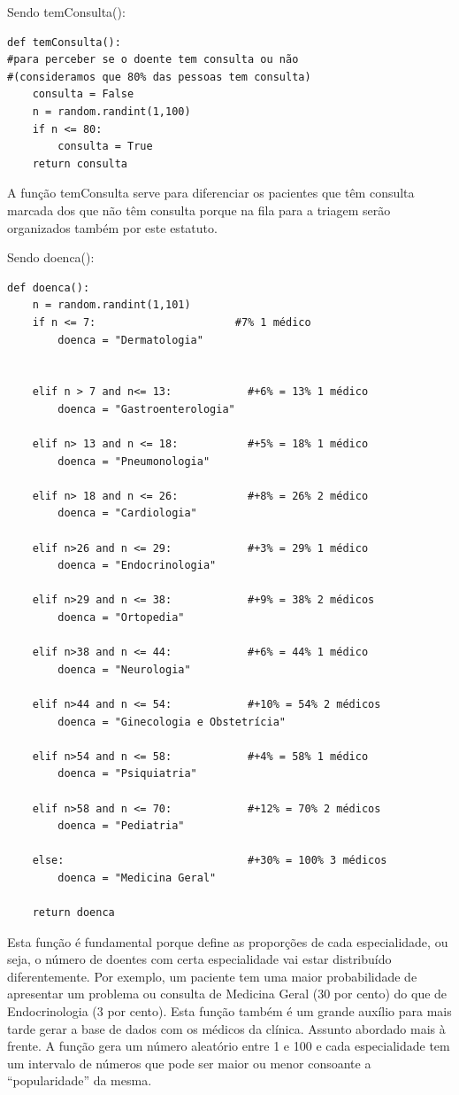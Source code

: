 \documentclass[12pt,a4paper]{article} %
\begin{document}
    Sendo temConsulta():
\hypertarget{temConsulta}{}
\begin{verbatim}
def temConsulta(): 
#para perceber se o doente tem consulta ou não 
#(consideramos que 80% das pessoas tem consulta)
    consulta = False
    n = random.randint(1,100) 
    if n <= 80:
        consulta = True
    return consulta
\end{verbatim}

    A função temConsulta serve para diferenciar os pacientes que têm consulta marcada dos que não têm consulta porque na fila para a triagem serão organizados também por este estatuto. 

    Sendo doenca(): 
\begin{verbatim}
def doenca():
    n = random.randint(1,101)
    if n <= 7:                      #7% 1 médico
        doenca = "Dermatologia"


    elif n > 7 and n<= 13:            #+6% = 13% 1 médico
        doenca = "Gastroenterologia"

    elif n> 13 and n <= 18:           #+5% = 18% 1 médico
        doenca = "Pneumonologia"

    elif n> 18 and n <= 26:           #+8% = 26% 2 médico
        doenca = "Cardiologia"

    elif n>26 and n <= 29:            #+3% = 29% 1 médico
        doenca = "Endocrinologia"

    elif n>29 and n <= 38:            #+9% = 38% 2 médicos
        doenca = "Ortopedia"

    elif n>38 and n <= 44:            #+6% = 44% 1 médico
        doenca = "Neurologia"

    elif n>44 and n <= 54:            #+10% = 54% 2 médicos
        doenca = "Ginecologia e Obstetrícia"

    elif n>54 and n <= 58:            #+4% = 58% 1 médico
        doenca = "Psiquiatria"

    elif n>58 and n <= 70:            #+12% = 70% 2 médicos
        doenca = "Pediatria"
        
    else:                             #+30% = 100% 3 médicos
        doenca = "Medicina Geral"

    return doenca
\end{verbatim}

    Esta função é fundamental porque define as proporções de cada especialidade, ou seja, o número de doentes com certa especialidade vai estar distribuído diferentemente. Por exemplo, um paciente tem uma maior probabilidade de apresentar um problema ou consulta de Medicina Geral (30 por cento) do que de Endocrinologia (3 por cento). Esta função também é um grande auxílio para mais tarde gerar a base de dados com os médicos da clínica. Assunto abordado mais à frente. A função gera um número aleatório entre 1 e 100 e cada especialidade tem um intervalo de números que pode ser maior ou menor consoante a “popularidade” da mesma. 
\end{document}
